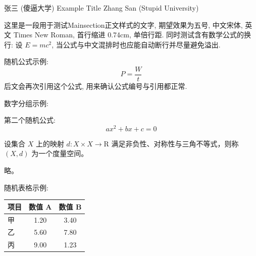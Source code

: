 \documentclass[twocolumn]{tem}
\begin{document}
{张三}
{(傻逼大学)}
{Example Title}
{Zhang San}
{(Stupid University)}



这里是一段用于测试Mainsection正文样式的文字, 期望效果为五号, 中文宋体, 英文 Times New Roman, 首行缩进 0.74cm, 单倍行距. 同时测试含有数学公式的换行: 设 $E=mc^2$, 当公式与中文混排时也应能自动断行并尽量避免溢出.

随机公式示例:
\begin{equation}
\label{eq:energy-balance}
P = \frac{W}{t}
\end{equation}
后文会再次引用这个公式, 用来确认公式编号与引用都正常.

数字分组示例: 

第二个随机公式:
\begin{equation}
\label{eq:quadratic}
ax^2 + bx + c = 0
\end{equation}
\zhlipsum[1]

设集合 $X$ 上的映射 $d: X\times X\to \mathrm{R}$ 满足非负性、对称性与三角不等式，则称 $(X,d)$ 为一个度量空间。

\Proof{}
略。


\zhlipsum[2]

随机表格示例:
\begin{table}[htbp]
\centering
{}
\XtuTableSetup
\begin{tabular}{@{}L C C@{}}
\toprule
项目 & 数值 A & 数值 B \\
\midrule
甲 & 1.20 & 3.40 \\
乙 & 5.60 & 7.80 \\
丙 & 9.00 & 1.23 \\
\bottomrule
\end{tabular}
\end{table}
\end{document}
